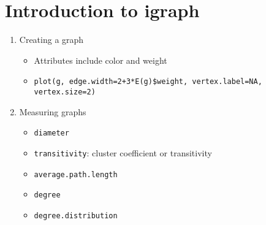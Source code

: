 \documentclass[14pt]{article}
\begin{document}
\section{Introduction to igraph}
\begin{enumerate}
 \item Creating a graph
  \begin{itemize}
   \item Attributes include color and weight
   \item \texttt{plot(g, edge.width=2+3*E(g)\$weight, vertex.label=NA, vertex.size=2)}
  \end{itemize}
 \item Measuring graphs
  \begin{itemize}
   \item \texttt{diameter}
   \item \texttt{transitivity}: cluster coefficient or transitivity
   \item \texttt{average.path.length}
   \item \texttt{degree}
   \item \texttt{degree.distribution}
  \end{itemize}
\end{enumerate}
\end{document}
